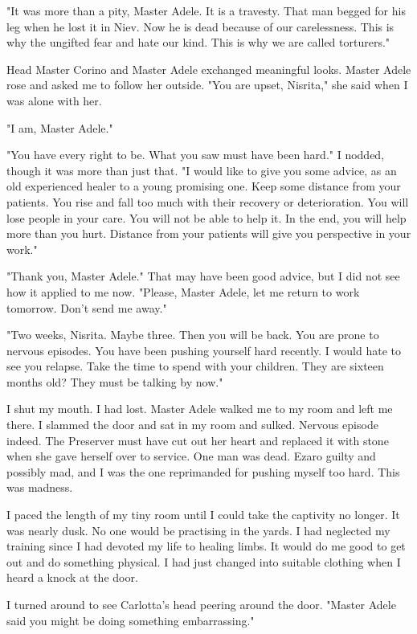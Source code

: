 \documentclass{article}
\begin{document}
"It was more than a pity, Master Adele. It is a travesty. That man begged for his leg when he lost it in Niev. Now he is dead because of our carelessness. This is why the ungifted fear and hate our kind. This is why we are called torturers."

Head Master Corino and Master Adele exchanged meaningful looks. Master Adele rose and asked me to follow her outside. "You are upset, Nisrita," she said when I was alone with her.

"I am, Master Adele."

"You have every right to be. What you saw must have been hard." I nodded, though it was more than just that. "I would like to give you some advice, as an old experienced healer to a young promising one. Keep some distance from your patients. You rise and fall too much with their recovery or deterioration. You will lose people in your care. You will not be able to help it. In the end, you will help more than you hurt. Distance from your patients will give you perspective in your work."

"Thank you, Master Adele." That may have been good advice, but I did not see how it applied to me now. "Please, Master Adele, let me return to work tomorrow. Don't send me away."

"Two weeks, Nisrita. Maybe three. Then you will be back. You are prone to nervous episodes. You have been pushing yourself hard recently. I would hate to see you relapse. Take the time to spend with your children. They are sixteen months old? They must be talking by now."

I shut my mouth. I had lost. Master Adele walked me to my room and left me there. I slammed the door and sat in my room and sulked. Nervous episode indeed. The Preserver must have cut out her heart and replaced it with stone when she gave herself over to service. One man was dead. Ezaro guilty and possibly mad, and I was the one reprimanded for pushing myself too hard. This was madness.

I paced the length of my tiny room until I could take the captivity no longer. It was nearly dusk. No one would be practising in the yards. I had neglected my training since I had devoted my life to healing limbs. It would do me good to get out and do something physical. I had just changed into suitable clothing when I heard a knock at the door. 

I turned around to see Carlotta's head peering around the door. "Master Adele said you might be doing something embarrassing."
\end{document}
